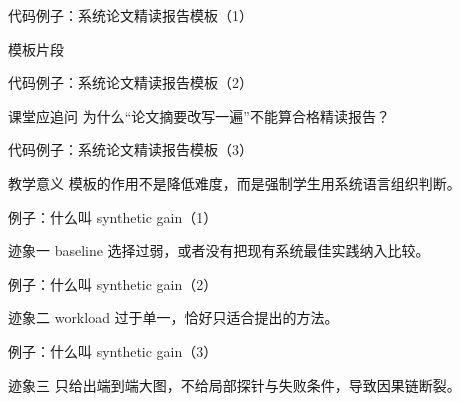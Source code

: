 \begin{frame}{代码例子：系统论文精读报告模板（1）}
\begin{block}{模板片段}
    {\ttfamily\small
    \par
    \par
    \par
    \par
    }
  \end{block}
\end{frame}

\begin{frame}{代码例子：系统论文精读报告模板（2）}
\begin{block}{课堂应追问}
    为什么“论文摘要改写一遍”不能算合格精读报告？
  \end{block}
\end{frame}

\begin{frame}{代码例子：系统论文精读报告模板（3）}
\begin{block}{教学意义}
    模板的作用不是降低难度，而是强制学生用系统语言组织判断。
  \end{block}
\end{frame}

\begin{frame}{例子：什么叫 synthetic gain（1）}
\begin{block}{迹象一}
    baseline 选择过弱，或者没有把现有系统最佳实践纳入比较。
  \end{block}
\end{frame}

\begin{frame}{例子：什么叫 synthetic gain（2）}
\begin{block}{迹象二}
    workload 过于单一，恰好只适合提出的方法。
  \end{block}
\end{frame}

\begin{frame}{例子：什么叫 synthetic gain（3）}
\begin{block}{迹象三}
    只给出端到端大图，不给局部探针与失败条件，导致因果链断裂。
  \end{block}
\end{frame}

